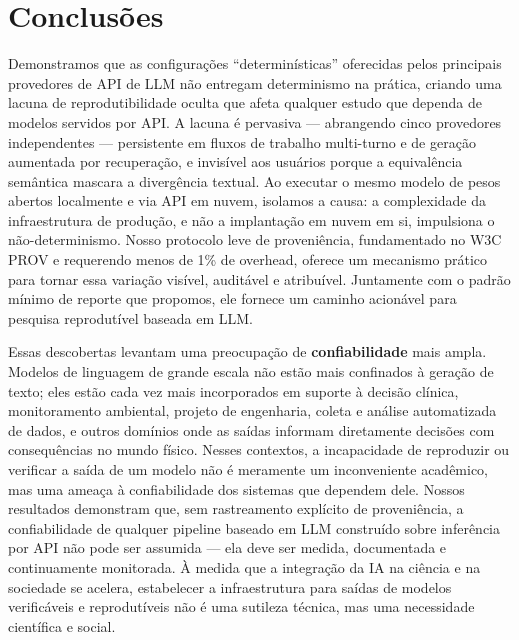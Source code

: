 \documentclass[12pt,a4paper]{article}
\begin{document}
\section*{Conclusões}

Demonstramos que as configurações ``determinísticas'' oferecidas pelos principais provedores de API de LLM não entregam determinismo na prática, criando uma lacuna de reprodutibilidade oculta que afeta qualquer estudo que dependa de modelos servidos por API.
A lacuna é pervasiva --- abrangendo cinco provedores independentes --- persistente em fluxos de trabalho multi-turno e de geração aumentada por recuperação, e invisível aos usuários porque a equivalência semântica mascara a divergência textual.
Ao executar o mesmo modelo de pesos abertos localmente e via API em nuvem, isolamos a causa: a complexidade da infraestrutura de produção, e não a implantação em nuvem em si, impulsiona o não-determinismo.
Nosso protocolo leve de proveniência, fundamentado no W3C PROV e requerendo menos de 1\% de overhead, oferece um mecanismo prático para tornar essa variação visível, auditável e atribuível.
Juntamente com o padrão mínimo de reporte que propomos, ele fornece um caminho acionável para pesquisa reprodutível baseada em LLM.

Essas descobertas levantam uma preocupação de \textbf{confiabilidade} mais ampla.
Modelos de linguagem de grande escala não estão mais confinados à geração de texto; eles estão cada vez mais incorporados em suporte à decisão clínica, monitoramento ambiental, projeto de engenharia, coleta e análise automatizada de dados, e outros domínios onde as saídas informam diretamente decisões com consequências no mundo físico.
Nesses contextos, a incapacidade de reproduzir ou verificar a saída de um modelo não é meramente um inconveniente acadêmico, mas uma ameaça à confiabilidade dos sistemas que dependem dele.
Nossos resultados demonstram que, sem rastreamento explícito de proveniência, a confiabilidade de qualquer pipeline baseado em LLM construído sobre inferência por API não pode ser assumida --- ela deve ser medida, documentada e continuamente monitorada.
À medida que a integração da IA na ciência e na sociedade se acelera, estabelecer a infraestrutura para saídas de modelos verificáveis e reprodutíveis não é uma sutileza técnica, mas uma necessidade científica e social.
\end{document}
